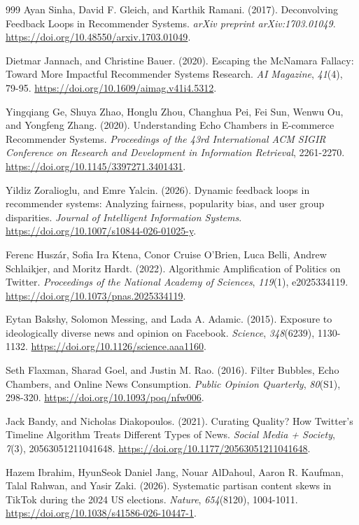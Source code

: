 \documentclass[10pt,a4paper]{article}
\begin{document}
\begin{thebibliography}{999}
Ayan Sinha, David F. Gleich, and Karthik Ramani. (2017). Deconvolving Feedback Loops in Recommender Systems. \textit{arXiv preprint arXiv:1703.01049}. \url{https://doi.org/10.48550/arxiv.1703.01049}.

Dietmar Jannach, and Christine Bauer. (2020). Escaping the McNamara Fallacy: Toward More Impactful Recommender Systems Research. \textit{AI Magazine}, \textit{41}(4), 79-95. \url{https://doi.org/10.1609/aimag.v41i4.5312}.

Yingqiang Ge, Shuya Zhao, Honglu Zhou, Changhua Pei, Fei Sun, Wenwu Ou, and Yongfeng Zhang. (2020). Understanding Echo Chambers in E-commerce Recommender Systems. \textit{Proceedings of the 43rd International ACM SIGIR Conference on Research and Development in Information Retrieval}, 2261-2270. \url{https://doi.org/10.1145/3397271.3401431}.

Yildiz Zoralioglu, and Emre Yalcin. (2026). Dynamic feedback loops in recommender systems: Analyzing fairness, popularity bias, and user group disparities. \textit{Journal of Intelligent Information Systems}. \url{https://doi.org/10.1007/s10844-026-01025-y}.

Ferenc Husz\'{a}r, Sofia Ira Ktena, Conor Cruise O'Brien, Luca Belli, Andrew Schlaikjer, and Moritz Hardt. (2022). Algorithmic Amplification of Politics on Twitter. \textit{Proceedings of the National Academy of Sciences}, \textit{119}(1), e2025334119. \url{https://doi.org/10.1073/pnas.2025334119}.

Eytan Bakshy, Solomon Messing, and Lada A. Adamic. (2015). Exposure to ideologically diverse news and opinion on Facebook. \textit{Science}, \textit{348}(6239), 1130-1132. \url{https://doi.org/10.1126/science.aaa1160}.

Seth Flaxman, Sharad Goel, and Justin M. Rao. (2016). Filter Bubbles, Echo Chambers, and Online News Consumption. \textit{Public Opinion Quarterly}, \textit{80}(S1), 298-320. \url{https://doi.org/10.1093/poq/nfw006}.

Jack Bandy, and Nicholas Diakopoulos. (2021). Curating Quality? How Twitter's Timeline Algorithm Treats Different Types of News. \textit{Social Media + Society}, \textit{7}(3), 20563051211041648. \url{https://doi.org/10.1177/20563051211041648}.

Hazem Ibrahim, HyunSeok Daniel Jang, Nouar AlDahoul, Aaron R. Kaufman, Talal Rahwan, and Yasir Zaki. (2026). Systematic partisan content skews in TikTok during the 2024 US elections. \textit{Nature}, \textit{654}(8120), 1004-1011. \url{https://doi.org/10.1038/s41586-026-10447-1}.


\end{thebibliography}
\end{document}
